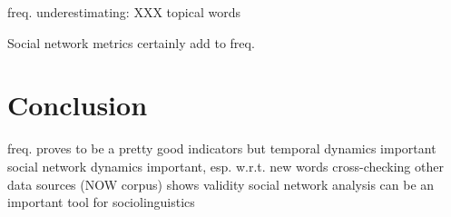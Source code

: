 \documentclass[draft, a4paper, abstract=on]{scrartcl}
\begin{document}
  freq. underestimating: XXX
  topical words

  Social network metrics certainly add to freq.

\section{Conclusion}

freq. proves to be a pretty good indicators
but
temporal dynamics important
social network dynamics important, esp. w.r.t. new words
cross-checking other data sources (NOW corpus) shows validity
social network analysis can be an important tool for sociolinguistics


\printbibliography
\end{document}
